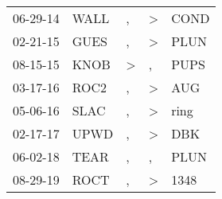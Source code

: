 \begin{supertabular}{lllll}
 06-29-14 &   WALL &                , &     \textgreater &   COND \\
 02-21-15 &   GUES &                , &     \textgreater &   PLUN \\
 08-15-15 &   KNOB &     \textgreater &                , &   PUPS \\
 03-17-16 &   ROC2 &                , &     \textgreater &    AUG \\
 05-06-16 &   SLAC &                , &     \textgreater &   ring \\
 02-17-17 &   UPWD &                , &     \textgreater &    DBK \\
 06-02-18 &   TEAR &                , &                , &   PLUN \\
 08-29-19 &   ROCT &                , &     \textgreater &   1348 \\
\end{supertabular}
